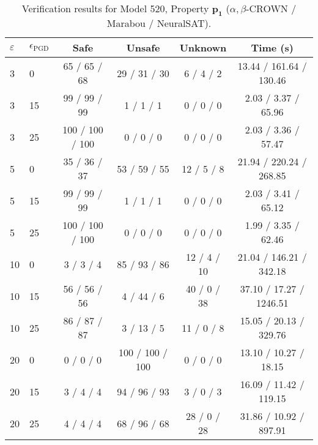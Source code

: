 \begin{table}[htbp]\centering
\caption{\small Verification results for Model 520, Property $\mathbf{p_{1}}$ ($\alpha,\beta$-CROWN / Marabou / NeuralSAT).}
\label{tab:model520_p1}
\begin{tabular}{llcccc}
\toprule
$\varepsilon$ & $\epsilon_{\scriptscriptstyle\mathrm{PGD}}$ & Safe & Unsafe & Unknown & Time (s) \\
\midrule
3 & 0 & 65 / 65 / 68 & 29 / 31 / 30 & 6 / 4 / 2 & 13.44 / 161.64 / 130.46 \\
3 & 15 & 99 / 99 / 99 & 1 / 1 / 1 & 0 / 0 / 0 & 2.03 / 3.37 / 65.96 \\
3 & 25 & 100 / 100 / 100 & 0 / 0 / 0 & 0 / 0 / 0 & 2.03 / 3.36 / 57.47 \\
5 & 0 & 35 / 36 / 37 & 53 / 59 / 55 & 12 / 5 / 8 & 21.94 / 220.24 / 268.85 \\
5 & 15 & 99 / 99 / 99 & 1 / 1 / 1 & 0 / 0 / 0 & 2.03 / 3.41 / 65.12 \\
5 & 25 & 100 / 100 / 100 & 0 / 0 / 0 & 0 / 0 / 0 & 1.99 / 3.35 / 62.46 \\
10 & 0 & 3 / 3 / 4 & 85 / 93 / 86 & 12 / 4 / 10 & 21.04 / 146.21 / 342.18 \\
10 & 15 & 56 / 56 / 56 & 4 / 44 / 6 & 40 / 0 / 38 & 37.10 / 17.27 / 1246.51 \\
10 & 25 & 86 / 87 / 87 & 3 / 13 / 5 & 11 / 0 / 8 & 15.05 / 20.13 / 329.76 \\
20 & 0 & 0 / 0 / 0 & 100 / 100 / 100 & 0 / 0 / 0 & 13.10 / 10.27 / 18.15 \\
20 & 15 & 3 / 4 / 4 & 94 / 96 / 93 & 3 / 0 / 3 & 16.09 / 11.42 / 119.15 \\
20 & 25 & 4 / 4 / 4 & 68 / 96 / 68 & 28 / 0 / 28 & 31.86 / 10.92 / 897.91 \\
\bottomrule
\end{tabular}
\end{table}
